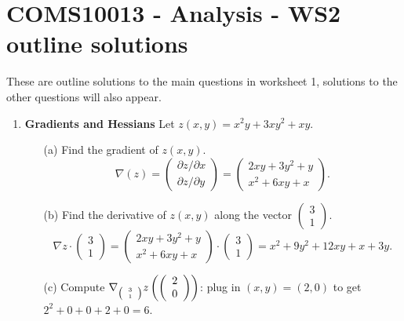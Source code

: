 \documentclass[11pt,a4paper]{scrartcl}
\begin{document}
\section*{COMS10013 - Analysis - WS2 outline solutions}

These are outline solutions to the main questions in worksheet 1, solutions to the other questions will also appear.


\begin{enumerate}

\item \textbf{Gradients and Hessians} Let $z(x,y) = x^2y + 3xy^2 + xy$.
	\begin{itemize}
	\item[(a)] Find the gradient of $z(x,y)$.
          \begin{equation}
            \nabla(z)=
          \left(\begin{array}{c} \partial z/\partial x \\
		                    \partial z/\partial y\end{array}\right)
		                    =
		              \left(\begin{array}{c}
		              2xy + 3y^2 + y \\
		              x^2 + 6xy + x
		              \end{array}\right).\end{equation}
	\item[(b)] Find the derivative of $z(x,y)$ along the vector $\left(\begin{array}{c} 3 \\ 1 \end{array}\right).$
          \begin{equation}
          \nabla z \cdot \left(\begin{array}{c}
		3 \\ 1
		\end{array}\right) 
		= 
		\left(\begin{array}{c}
		              2xy + 3y^2 + y \\
		              x^2 + 6xy + x
		              \end{array}\right)
		              \cdot 
		              \left(\begin{array}{c}
		3 \\ 1
		\end{array}\right) 
		= x^2 + 9y^2 + 12xy + x + 3y.
\end{equation}
        \item[(c)] Compute $\nabla_{\tiny\left(\begin{array}{c} 3 \\ 1 \end{array}\right)} z \left(\left(\begin{array}{c} 2 \\ 0 \end{array}\right)\right)$: plug in $(x,y)=(2,0)$ to get $2^2 + 0 + 0 + 2 + 0 = 6$.

\end{itemize}
\end{enumerate}
\end{document}
